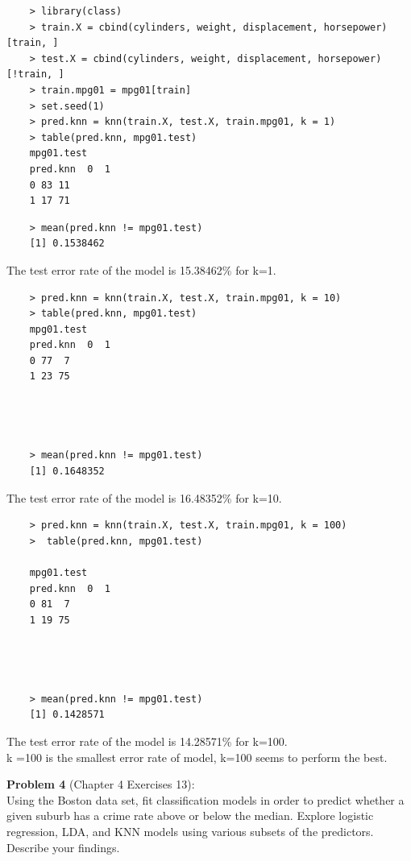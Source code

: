 \documentclass{article}
\begin{document}
\begin{program}
	\begin{verbatim}	
	> library(class)
	> train.X = cbind(cylinders, weight, displacement, horsepower)[train, ]
	> test.X = cbind(cylinders, weight, displacement, horsepower)[!train, ]
	> train.mpg01 = mpg01[train]
	> set.seed(1)
	> pred.knn = knn(train.X, test.X, train.mpg01, k = 1)
	> table(pred.knn, mpg01.test)
	mpg01.test
	pred.knn  0  1
	0 83 11
	1 17 71
	\end{verbatim}
\end{program}

\begin{program}
	\begin{verbatim}	
	> mean(pred.knn != mpg01.test)
	[1] 0.1538462
	\end{verbatim}
\end{program}

The test error rate of the model is 15.38462\% for k=1.

\newpage
\begin{program}
	\begin{verbatim}	
	> pred.knn = knn(train.X, test.X, train.mpg01, k = 10)
	> table(pred.knn, mpg01.test)
	mpg01.test
	pred.knn  0  1
	0 77  7
	1 23 75	




	> mean(pred.knn != mpg01.test)
	[1] 0.1648352

	\end{verbatim}
\end{program}

The test error rate of the model is 16.48352\% for k=10.


\begin{program}
	\begin{verbatim}	
	> pred.knn = knn(train.X, test.X, train.mpg01, k = 100)
	>  table(pred.knn, mpg01.test)
	
	mpg01.test
	pred.knn  0  1
	0 81  7
	1 19 75
	
	
	
	
	> mean(pred.knn != mpg01.test)
	[1] 0.1428571
	\end{verbatim}
\end{program}

The test error rate of the model is 14.28571\% for k=100.\\
k =100 is the smallest error rate of model, k=100 seems to perform the best.

\newpage
{\bf Problem 4} (Chapter 4 Exercises 13):\\
Using the Boston data set, fit classification models in order to predict whether a given suburb has a crime rate above or below the median. Explore logistic regression, LDA, and KNN models using various subsets of the predictors. Describe your findings.
\end{document}
